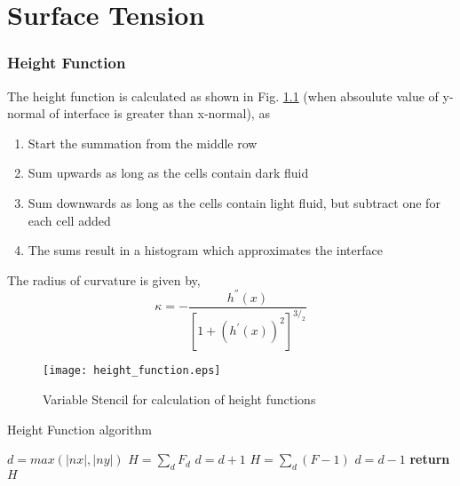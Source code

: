  
\chapter{Surface Tension}

\subsection{Height Function}

The height function is calculated as shown in Fig. \ref{height_function} (when absoulute value of y-normal of interface is greater
than x-normal), as
\begin{enumerate}
 \item Start the summation from the middle row
 \item Sum upwards as long as the cells contain dark fluid
 \item Sum downwards as long as the cells contain light fluid,
but subtract one for each cell added
\item The sums result in a histogram which approximates the
interface
\end{enumerate}



The radius of curvature is given by,
\begin{equation}
 \kappa = -\frac{h^{''}(x)}{[1+(h^{'}(x))^2]^{3/_2}}	%
\end{equation}


\begin{figure}
 \centering
 \texttt{[image: height\_function.eps]}
 \caption{Variable Stencil for calculation of height functions}
 \label{height_function}
\end{figure}

\begin{algorithm}
  \caption{Height Function algorithm}\label{euclid}
  \begin{algorithmic}[1]
        \State {} 
        \State $d = max(|nx|,|ny|)$ 
        \State {} %
        \State \texttt{$H = \sum_d F_d$}
        \State $d=d+1$
        \EndWhile
         \State {} %
        \State \texttt{$H = \sum_d (F-1)$}
         \State $d=d-1$
        \EndWhile
	 \State \EndIf 
      \EndFor
      \State \textbf{return} $H$
    \EndProcedure
  \end{algorithmic}
\end{algorithm}


